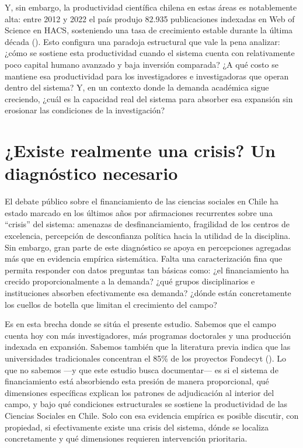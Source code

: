 \documentclass[
  spanish,
  a4paper,
  oneside]{scrbook}
\begin{document}
Y, sin embargo, la productividad científica chilena en estas áreas es
notablemente alta: entre 2012 y 2022 el país produjo 82.935
publicaciones indexadas en Web of Science en HACS, sosteniendo una tasa
de crecimiento estable durante la última década
(). Esto
configura una paradoja estructural que vale la pena analizar: ¿cómo se
sostiene esta productividad cuando el sistema cuenta con relativamente
poco capital humano avanzado y baja inversión comparada? ¿A qué costo se
mantiene esa productividad para los investigadores e investigadoras que
operan dentro del sistema? Y, en un contexto donde la demanda académica
sigue creciendo, ¿cuál es la capacidad real del sistema para absorber
esa expansión sin erosionar las condiciones de la investigación?

\section{¿Existe realmente una crisis? Un diagnóstico
necesario}\label{existe-realmente-una-crisis-un-diagnuxf3stico-necesario}

El debate público sobre el financiamiento de las ciencias sociales en
Chile ha estado marcado en los últimos años por afirmaciones recurrentes
sobre una ``crisis'' del sistema: amenazas de desfinanciamiento,
fragilidad de los centros de excelencia, percepción de desconfianza
política hacia la utilidad de la disciplina. Sin embargo, gran parte de
este diagnóstico se apoya en percepciones agregadas más que en evidencia
empírica sistemática. Falta una caracterización fina que permita
responder con datos preguntas tan básicas como: ¿el financiamiento ha
crecido proporcionalmente a la demanda? ¿qué grupos disciplinarios e
instituciones absorben efectivamente esa demanda? ¿dónde están
concretamente los cuellos de botella que limitan el crecimiento del
campo?

Es en esta brecha donde se sitúa el presente estudio. Sabemos que el
campo cuenta hoy con más investigadores, más programas doctorales y una
producción indexada en expansión. Sabemos también que la literatura
previa indica que las universidades tradicionales concentran el 85\% de
los proyectos Fondecyt
(). Lo
que no sabemos ---y que este estudio busca documentar--- es si el
sistema de financiamiento está absorbiendo esta presión de manera
proporcional, qué dimensiones específicas explican los patrones de
adjudicación al interior del campo, y bajo qué condiciones estructurales
se sostiene la productividad de las Ciencias Sociales en Chile. Solo con
esa evidencia empírica es posible discutir, con propiedad, si
efectivamente existe una crisis del sistema, dónde se localiza
concretamente y qué dimensiones requieren intervención prioritaria.
\end{document}
